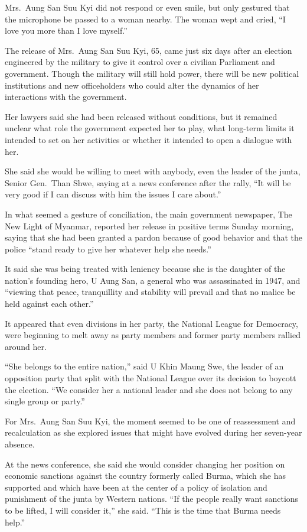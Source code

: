 ﻿\documentclass[12pt]{article}
\begin{document}
Mrs.~Aung San Suu Kyi did not respond or even smile, but only gestured that the microphone be passed
to a woman nearby. The woman wept and cried, ``I love you more than I love myself.''

The release of Mrs.~Aung San Suu Kyi, 65, came just six days after an election engineered by the
military to give it control over a civilian Parliament and government. Though the military will
still hold power, there will be new political institutions and new officeholders who could alter the
dynamics of her interactions with the government.

Her lawyers said she had been released without conditions, but it remained unclear what role the
government expected her to play, what long-term limits it intended to set on her activities or
whether it intended to open a dialogue with her.

She said she would be willing to meet with anybody, even the leader of the junta, Senior Gen.~Than
Shwe, saying at a news conference after the rally, ``It will be very good if I can discuss with him
the issues I care about.''

In what seemed a gesture of conciliation, the main government newspaper, The New Light of Myanmar,
reported her release in positive terms Sunday morning, saying that she had been granted a pardon
because of good behavior and that the police ``stand ready to give her whatever help she needs.''

It said she was being treated with leniency because she is the daughter of the nation's founding
hero, U Aung San, a general who was assassinated in 1947, and ``viewing that peace, tranquillity and
stability will prevail and that no malice be held against each other.''

It appeared that even divisions in her party, the National League for Democracy, were beginning to
melt away as party members and former party members rallied around her.

``She belongs to the entire nation,'' said U Khin Maung Swe, the leader of an opposition party that
split with the National League over its decision to boycott the election. ``We consider her a
national leader and she does not belong to any single group or party.''

For Mrs.~Aung San Suu Kyi, the moment seemed to be one of reassessment and recalculation as she
explored issues that might have evolved during her seven-year absence.

At the news conference, she said she would consider changing her position on economic sanctions
against the country formerly called Burma, which she has supported and which have been at the center
of a policy of isolation and punishment of the junta by Western nations. ``If the people really want
sanctions to be lifted, I will consider it,'' she said. ``This is the time that Burma needs help.''
\end{document}
